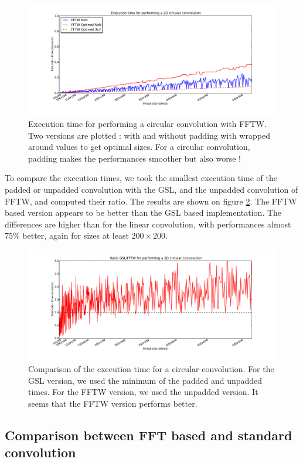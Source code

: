 \documentclass[a4paper,10pt,twoside]{article}
\begin{document}
\begin{figure}[htbp]
\center \includegraphics[width=0.75\linewidth]{Images/benchmark_circular_convolution_fftw.pdf}
\caption{\label{fig:benchmark_circular_convolution_fftw.pdf}Execution time for performing a circular convolution with FFTW. Two versions are plotted : with and without padding with wrapped around values to get optimal sizes. For a circular convolution, padding makes the performances smoother but also worse !}
\end{figure}


To compare the execution times, we took the smallest execution time of the padded or unpadded convolution with the GSL, and the unpadded convolution of FFTW, and computed their ratio. The results are shown on figure \ref{fig:benchmark_circular_convolution_compare.pdf}. The FFTW based version appears to be better than the GSL based implementation. The differences are higher than for the linear convolution, with performances almost $75\%$ better, again for sizes at least $200 \times 200$.

\begin{figure}[htbp]
\center \includegraphics[width=0.75\linewidth]{Images/benchmark_circular_convolution_compare.pdf}
\caption{\label{fig:benchmark_circular_convolution_compare.pdf} Comparison of the execution time for a circular convolution. For the GSL version, we used the minimum of the padded and unpadded times. For the FFTW version, we used the unpadded version. It seems that the FFTW version performs better.}
\end{figure}

\pagebreak
\subsection{Comparison between FFT based and standard convolution}
\end{document}
